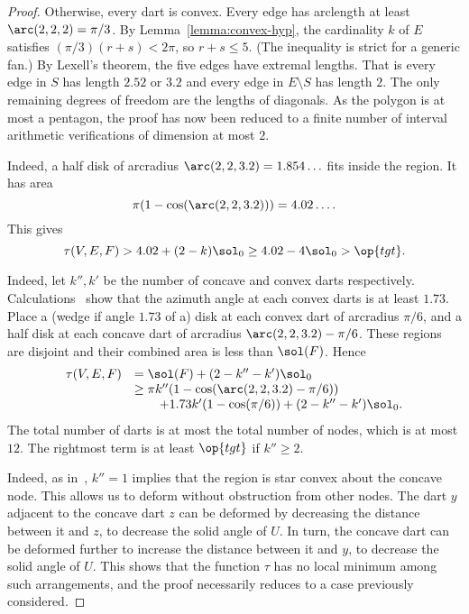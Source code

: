 \begin{proof}
  Otherwise, every dart is convex.
Every edge has
arclength at least $\arc(2,2,2)=\pi/3$.  By
Lemma~\ref{lemma:convex-hyp}, the cardinality $k$ of $E$ satisfies
$(\pi/3)(r+s) < 2\pi$, so $r+s\le5$.   (The inequality is strict for a generic fan.)  
By Lexell's theorem, the five edges have extremal lengths.
That is every edge
in $S$ has length $2.52$ or $3.2$ and every edge in $E\setminus S$ has length $2$.
The only remaining degrees of freedom are the lengths of
diagonals.  As the polygon is at most a pentagon, the proof has now
been reduced to a finite number of interval arithmetic verifications
of dimension at most $2$.  

  Indeed, a
  half disk of arcradius $\arc(2,2,3.2)=1.854\ldots$ fits inside the
  region.  It has area
\begin{displaymath}
\pi(1-\cos(\arc(2,2,3.2)))=4.02\ldots.
\end{displaymath}
This gives
\begin{displaymath}
\tau(V,E,F) > 4.02 + (2-k)\sol_0 \ge 4.02 -4 \sol_0 > \op{tgt}.
\end{displaymath}
%


 Indeed, 
let $k'',k'$ be the number of concave and convex darts respectively.
Calculations~\cite[cc:lft]{hales:2009:nonlinear} show that the azimuth
angle at each convex darts is at least $1.73$.  Place a (wedge if
angle $1.73$ of a) disk at each convex dart of arcradius $\pi/6$, and
a half disk at each concave dart of arcradius $\arc(2,2,3.2)-\pi/6$.
These regions are disjoint and their combined area is less than
$\sol(F)$.  Hence
\begin{displaymath}
\begin{array}{lll}
\tau(V,E,F)&=\sol(F)+(2-k''-k')\sol_0 \\
&\ge \pi k'' (1-\cos(\arc(2,2,3.2)-\pi/6)) \\
&\qquad+ 1.73 k' (1-\cos(\pi/6)) + (2-k''-k')\sol_0.
\end{array}
\end{displaymath}
The total number of darts is at most the total number of nodes, which
is at most $12$.  The rightmost term is at least $\op{tgt}$ if $k''\ge
2$.   

 Indeed,
as in~\cite{Hales:2006:DCG}, $k''=1$ implies that the region is star
convex about the concave node.  This allows us to deform without
obstruction from other nodes.  The dart $y$ adjacent to the concave
dart $z$ can be deformed by decreasing the distance between it and
$z$, to decrease the solid angle of $U$.  In turn, the concave dart
can be deformed further to increase the distance between it and $y$,
to decrease the solid angle of $U$.  This shows that the function
$\tau$ has no local minimum among such arrangements, and the proof
necessarily reduces to a case previously considered.  
%
%



\end{proof}
